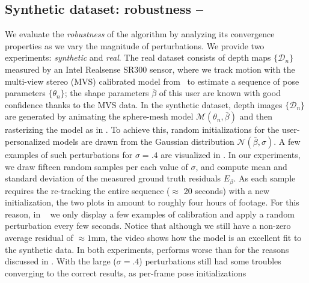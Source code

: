 \subsection{Synthetic dataset: robustness -- }
\label{sec:evalsynth}
We evaluate the \emph{robustness} of the algorithm by analyzing its convergence properties as we vary the magnitude of perturbations.
We provide two experiments: \emph{synthetic} and \emph{real}. The real dataset consists of depth maps $\{\mathcal{D}_n\}$ measured by an Intel Realsense SR300 sensor, where we track motion with the multi-view stereo (MVS) calibrated model from~\cite{tkach2016sphere} to estimate a sequence of pose parameters $\{ \theta_n \}$; the shape parameters $\bar\beta$ of this user are known with good confidence thanks to the MVS data. In the synthetic dataset, depth images $\{\mathcal{D}_n\}$ are generated by animating the sphere-mesh model $\mathcal{M}(\theta_n, \bar\beta)$ and then rasterizing the model as in .
To achieve this, random initializations for the user-personalized models are drawn from the Gaussian distribution {\small $\mathcal{N}(\bar\beta, \sigma)$}. A few examples of such perturbations for $\sigma=.4$ are visualized in .
In our experiments, we draw fifteen random samples per each value of $\sigma$, and compute mean and standard deviation of the measured ground truth residuals $E_\beta$. 
As each sample requires the re-tracking the entire sequence ($\approx$ 20 seconds) with a new initialization, the two plots in  amount to roughly four hours of footage. For this reason, in ~\VideoSynth{} we only display a few examples of calibration 
and apply a random perturbation every few seconds.
Notice that although we still have a non-zero average residual of $\approx 1$mm, the video shows how the model is an excellent fit to the synthetic data.  
In both experiments, \OfflineHard{} performs worse than \OfflineSoft{} for the reasons discussed in . With the large ($\sigma=.4$) perturbations \OfflineSoft{} still had some troubles converging to the correct results, as per-frame pose initializations 
